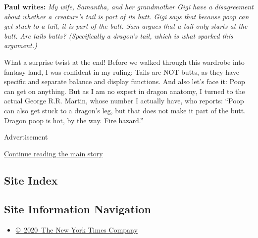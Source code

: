 \textbf{Paul writes:} \emph{My wife, Samantha, and her grandmother Gigi
have a disagreement about whether a creature's tail is part of its butt.
Gigi says that because poop can get stuck to a tail, it is part of the
butt. Sam argues that a tail only starts at the butt. Are tails butts?
(Specifically a dragon's tail, which is what sparked this argument.)}

What a surprise twist at the end! Before we walked through this wardrobe
into fantasy land, I was confident in my ruling: Tails are NOT butts, as
they have specific and separate balance and display functions. And also
let's face it: Poop can get on anything. But as I am no expert in dragon
anatomy, I turned to the actual George R.R. Martin, whose number I
actually have, who reports: ``Poop can also get stuck to a dragon's leg,
but that does not make it part of the butt. Dragon poop is hot, by the
way. Fire hazard.''

Advertisement

\protect\hyperlink{after-bottom}{Continue reading the main story}

\hypertarget{site-index}{%
\subsection{Site Index}\label{site-index}}

\hypertarget{site-information-navigation}{%
\subsection{Site Information
Navigation}\label{site-information-navigation}}

\begin{itemize}
\tightlist
\item
  \href{https://help.nytimes3xbfgragh.onion/hc/en-us/articles/115014792127-Copyright-notice}{©~2020~The
  New York Times Company}
\end{itemize}

